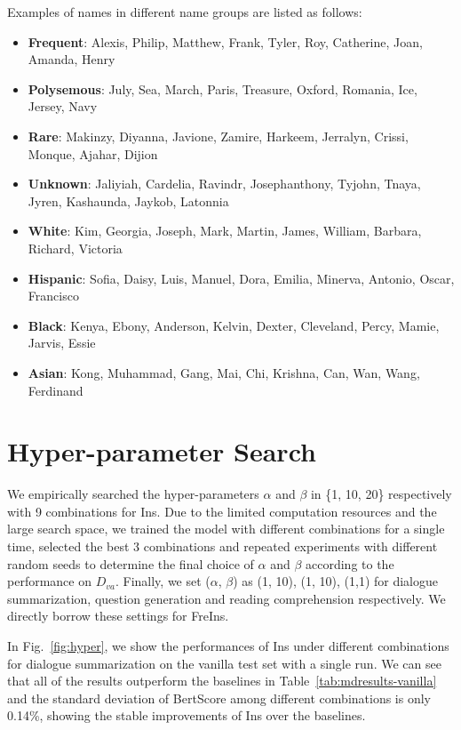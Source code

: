 Examples of names in different name groups are listed as follows:
\begin{itemize}
	\item \textbf{Frequent}: Alexis, Philip, Matthew, Frank, Tyler, Roy, Catherine, Joan, Amanda, Henry
	\item \textbf{Polysemous}: July, Sea, March, Paris, Treasure, Oxford, Romania, Ice, Jersey, Navy
	\item \textbf{Rare}: Makinzy, Diyanna, Javione, Zamire, Harkeem, Jerralyn, Crissi, Monque, Ajahar, Dijion
	\item \textbf{Unknown}: Jaliyiah, Cardelia, Ravindr, Josephanthony, Tyjohn, Tnaya, Jyren, Kashaunda, Jaykob, Latonnia
	\item \textbf{White}: Kim, Georgia, Joseph, Mark, Martin, James, William, Barbara, Richard, Victoria
	\item \textbf{Hispanic}: Sofia, Daisy, Luis, Manuel, Dora, Emilia, Minerva, Antonio, Oscar, Francisco
	\item \textbf{Black}: Kenya, Ebony, Anderson, Kelvin, Dexter, Cleveland, Percy, Mamie, Jarvis, Essie
	\item \textbf{Asian}: Kong, Muhammad, Gang, Mai, Chi, Krishna, Can, Wan, Wang, Ferdinand
\end{itemize}





\section{Hyper-parameter Search}
\label{sec:app-hyper}
We empirically searched the hyper-parameters $\alpha$ and $\beta$ in \{1, 10, 20\} respectively with 9 combinations for Ins. Due to the limited computation resources and the large search space, we trained the model with different combinations for a single time, selected the best 3 combinations and 
repeated experiments with different random seeds to determine the final choice of $\alpha$ and $\beta$ according to the performance on $D_{va}$. Finally, we set ($\alpha$, $\beta$) as (1, 10), (1, 10), (1,1) for dialogue summarization, question generation and reading comprehension respectively. We directly borrow these settings for FreIns.

In Fig.~\ref{fig:hyper}, we show the performances of Ins under different combinations for dialogue summarization on the vanilla test set with a single run. We can see that all of the results outperform the baselines in Table~\ref{tab:mdresults-vanilla} and the standard deviation of BertScore among different combinations is only 0.14\%, showing the stable improvements of Ins over the baselines.

